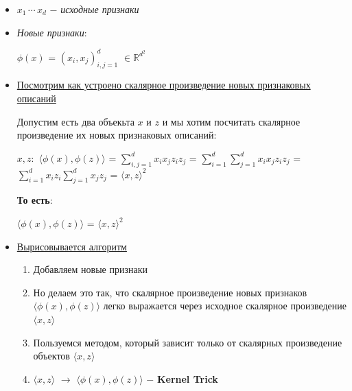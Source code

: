         \begin{itemize}
            \item $x_1 \, \cdots \, x_d$ $-$ \textit{исходные признаки}

            \item{\textit{Новые признаки}:}

                $\phi(x)$ = $(x_i, x_j)_{i,j = 1}^d$ $\in \mathbb{R}^{d^2}$

            \item{\underline{Посмотрим как устроено скалярное произведение новых признаковых описаний}}

            Допустим есть два объекьта $x$ и $z$ и мы хотим посчитать скалярное произведение их новых признаковых описаний:
            \begin{center}
            \Large
                $x, z:$ \quad $\langle \phi(x), \phi(z) \rangle$ = $\sum\limits_{i,j = 1}^dx_ix_jz_iz_j$ = $\sum\limits_{i = 1}^d\sum\limits_{j = 1}^dx_ix_jz_iz_j$ = $\sum\limits_{i = 1}^dx_iz_i\sum\limits_{j = 1}^dx_jz_j$ = $\langle x, z \rangle^2$
            \end{center}

            \textbf{То есть}:
            \begin{center}
            \huge
                $\langle \phi(x), \phi(z) \rangle$ = $\langle x, z \rangle^2$
            \end{center}
            
            \item{\underline{Вырисовывается алгоритм}}

            \begin{enumerate}
                \item Добавляем новые признаки

                \item Но делаем это так, что скалярное произведение новых признаков $\langle \phi(x), \phi(z) \rangle$ легко выражается через исходное скалярное произведение $\langle x, z \rangle$

                \item Пользуемся методом, который зависит только от скалярных произведение объектов $\langle x, z \rangle$

                \item $\langle x, z \rangle$ $\longrightarrow$ $\langle \phi(x), \phi(z) \rangle$  \quad $-$ \textbf{Kernel Trick}
            \end{enumerate}
        \end{itemize}


